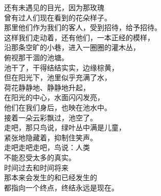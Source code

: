 \documentclass{article}
\begin{document}
还有未遇见的目光，因为那玫瑰\\
曾有过人们现在看到的花朵样子。
\newpage
\\
那里他们作为我们的客人，受到招待，给予招待。\\
这样我们走动着，还有他们，一本正经的模样，\\
沿那条空旷的小巷，进入一圈圈的灌木丛，\\
俯视那干涸的池塘。\\
池干了，干得结结实实，边缘棕黄，\\
但在阳光下，池里似乎充满了水，\\
荷花静静地、静静地升起，\\
在阳光的中心，水面闪闪发亮，\\
他们在我们身后，也映在池水中。\\
接着一朵云彩飘过，池空了。\\
走吧，那只鸟说，绿叶丛中满是儿童，\\
紧张地隐藏着，抑制住笑声。\\
走吧走吧走吧，鸟说：人类\\
不能忍受太多的真实。\\
时间过去和时间将来\\
那本来会发生的和已经发生的\\
都指向一个终点，终结永远是现在。 
\end{document}
